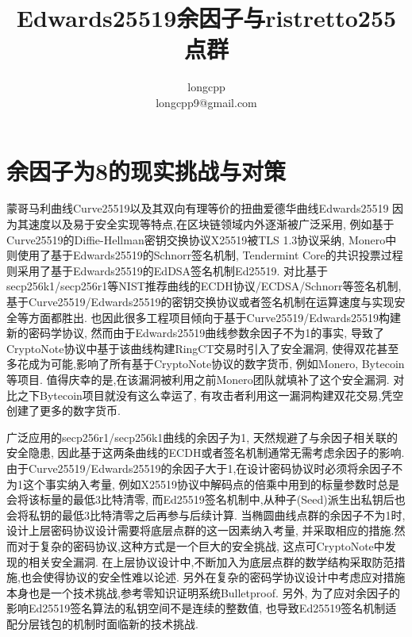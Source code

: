 \documentclass{article}
\begin{document}
\title{Edwards25519余因子与ristretto255点群}
\author{longcpp \\ \small{longcpp9@gmail.com}}

\maketitle

\section{余因子为8的现实挑战与对策}

蒙哥马利曲线Curve25519以及其双向有理等价的扭曲爱德华曲线Edwards25519
因为其速度以及易于安全实现等特点,在区块链领域内外逐渐被广泛采用, 
例如基于Curve25519的Diffie-Hellman密钥交换协议X25519被TLS 1.3协议采纳, 
Monero中则使用了基于Edwards25519的Schnorr签名机制, 
Tendermint Core的共识投票过程则采用了基于Edwards25519的EdDSA签名机制Ed25519. 
对比基于secp256k1/secp256r1等NIST推荐曲线的ECDH协议/ECDSA/Schnorr等签名机制, 
基于Curve25519/Edwards25519的密钥交换协议或者签名机制在运算速度与实现安全等方面都胜出.
也因此很多工程项目倾向于基于Curve25519/Edwards25519构建新的密码学协议,
然而由于Edwards25519曲线参数余因子不为1的事实,
导致了CryptoNote协议中基于该曲线构建RingCT交易时引入了安全漏洞,
使得双花甚至多花成为可能,影响了所有基于CryptoNote协议的数字货币, 例如Monero, Bytecoin等项目. 
值得庆幸的是,在该漏洞被利用之前Monero团队就填补了这个安全漏洞. 
对比之下Bytecoin项目就没有这么幸运了, 有攻击者利用这一漏洞构建双花交易,凭空创建了更多的数字货币.

广泛应用的secp256r1/secp256k1曲线的余因子为1, 天然规避了与余因子相关联的安全隐患,
因此基于这两条曲线的ECDH或者签名机制通常无需考虑余因子的影响.
由于Curve25519/Edwards25519的余因子大于1,在设计密码协议时必须将余因子不为1这个事实纳入考量,
例如X25519协议中解码点的倍乘中用到的标量参数时总是会将该标量的最低3比特清零,
而Ed25519签名机制中,从种子(Seed)派生出私钥后也会将私钥的最低3比特清零之后再参与后续计算.
当椭圆曲线点群的余因子不为1时,设计上层密码协议设计需要将底层点群的这一因素纳入考量,
并采取相应的措施.然而对于复杂的密码协议,这种方式是一个巨大的安全挑战, 
这点可CryptoNote中发现的相关安全漏洞.
在上层协议设计中,不断加入为底层点群的数学结构采取防范措施,也会使得协议的安全性难以论述.
另外在复杂的密码学协议设计中考虑应对措施本身也是一个技术挑战,参考零知识证明系统Bulletproof. 
另外, 为了应对余因子的影响Ed25519签名算法的私钥空间不是连续的整数值, 
也导致Ed25519签名机制适配分层钱包的机制时面临新的技术挑战.
\end{document}
